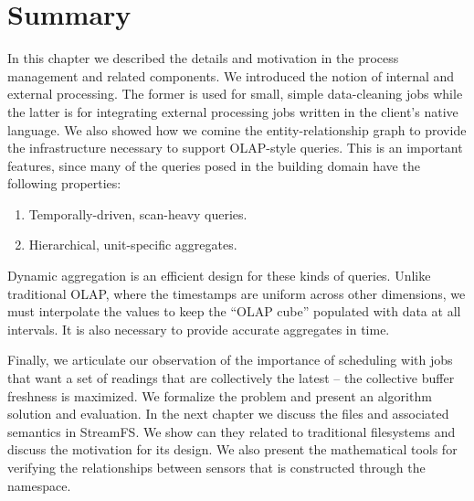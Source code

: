 \section{Summary}

In this chapter we described the details and motivation in the process management and related components.  We introduced the 
notion of internal and external processing.  The former is used for small, simple data-cleaning jobs while the latter
is for integrating external processing jobs written in the client's native language.
We also showed how we comine the entity-relationship graph to provide the infrastructure necessary to support OLAP-style queries.
This is an important features, since many of the queries posed in the building domain have the following properties:

\begin{enumerate}
\item Temporally-driven, scan-heavy queries.
\item Hierarchical, unit-specific aggregates.
\end{enumerate}

Dynamic aggregation is an efficient design for these kinds of queries.  Unlike traditional OLAP, where the timestamps
are uniform across other dimensions, we must interpolate the values to keep the ``OLAP cube'' populated with data at all
intervals.  It is also necessary to provide accurate aggregates in time.

Finally, we articulate our observation of the importance of scheduling with jobs that want a set of readings that are collectively
the latest -- the collective buffer freshness is maximized.  We formalize the problem and present an algorithm solution and evaluation.
In the next chapter we discuss the files and associated semantics in StreamFS.  We show can they related to traditional filesystems
and discuss the motivation for its design.  We also present the mathematical tools for verifying the relationships between sensors that
is constructed through the namespace.